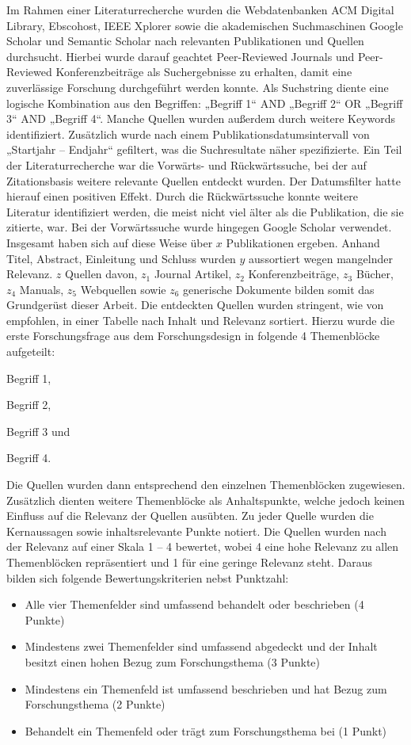 Im Rahmen einer Literaturrecherche wurden die Webdatenbanken ACM Digital Library,
Ebscohost, IEEE Xplorer sowie die akademischen Suchmaschinen Google Scholar und
Semantic Scholar nach relevanten Publikationen und Quellen durchsucht. Hierbei wurde
darauf geachtet Peer-Reviewed Journals und Peer-Reviewed Konferenzbeiträge als
Suchergebnisse zu erhalten, damit eine zuverlässige Forschung durchgeführt werden
konnte. Als Suchstring diente eine logische Kombination aus den Begriffen: „Begriff 1“ 
AND „Begriff 2“ OR „Begriff 3“ AND „Begriff 4“. Manche
Quellen wurden außerdem durch weitere Keywords identifiziert. Zusätzlich wurde nach
einem Publikationsdatumsintervall von „Startjahr -- Endjahr“ gefiltert, was die Suchresultate
näher spezifizierte. Ein Teil der Literaturrecherche war die Vorwärts- und
Rückwärtssuche, bei der auf Zitationsbasis weitere relevante Quellen entdeckt wurden.
Der Datumsfilter hatte hierauf einen positiven Effekt. Durch die Rückwärtssuche konnte
weitere Literatur identifiziert werden, die meist nicht viel älter als die Publikation, die
sie zitierte, war. Bei der Vorwärtssuche wurde hingegen Google Scholar verwendet.
Insgesamt haben sich auf diese Weise über $x$ Publikationen ergeben. Anhand Titel,
Abstract, Einleitung und Schluss wurden $y$ aussortiert wegen mangelnder Relevanz. $z$
Quellen davon, $z_1$ Journal Artikel, $z_2$ Konferenzbeiträge, $z_3$ Bücher, $z_4$ Manuals, 
$z_5$ Webquellen sowie $z_6$ generische Dokumente bilden somit das Grundgerüst dieser Arbeit.
Die entdeckten Quellen wurden stringent, wie von \citeauthor{Webster2002}
empfohlen, in einer Tabelle nach Inhalt und Relevanz sortiert. Hierzu wurde die erste
Forschungsfrage aus dem Forschungsdesign in folgende 4 Themenblöcke
aufgeteilt: 
%
\begin{compactitem}
\item Begriff 1,
\item Begriff 2,
\item Begriff 3 und
\item Begriff 4.
\end{compactitem}
%
Die Quellen wurden dann entsprechend den einzelnen Themenblöcken
zugewiesen. Zusätzlich dienten weitere Themenblöcke als Anhaltspunkte, welche jedoch
keinen Einfluss auf die Relevanz der Quellen ausübten. Zu jeder Quelle wurden die
Kernaussagen sowie inhaltsrelevante Punkte notiert. Die Quellen wurden nach der
Relevanz auf einer Skala 1 -- 4 bewertet, wobei 4 eine hohe Relevanz zu allen
Themenblöcken repräsentiert und 1 für eine geringe Relevanz steht. Daraus bilden sich
folgende Bewertungskriterien nebst Punktzahl:
\begin{itemize}
\item Alle vier Themenfelder sind umfassend behandelt oder beschrieben (4 Punkte)
\item Mindestens zwei Themenfelder sind umfassend abgedeckt und der Inhalt besitzt
  einen hohen Bezug zum Forschungsthema (3 Punkte)
\item Mindestens ein Themenfeld ist umfassend beschrieben und hat Bezug zum
  Forschungsthema (2 Punkte)
\item Behandelt ein Themenfeld oder trägt zum Forschungsthema bei (1 Punkt)
\end{itemize}

